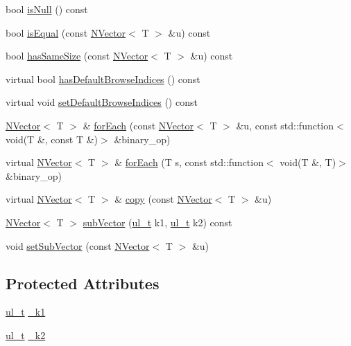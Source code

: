 \begin{DoxyCompactItemize}
\item 
bool \mbox{\hyperlink{class_n_vector_a6d2566f587ad233770ada3aeae0481e1}{is\+Null}} () const
\item 
bool \mbox{\hyperlink{class_n_vector_a496fb038e1612ce56c3b91a9c327c509}{is\+Equal}} (const \mbox{\hyperlink{class_n_vector}{N\+Vector}}$<$ T $>$ \&u) const
\item 
bool \mbox{\hyperlink{class_n_vector_aa9bef4cdf1e57cb0f2e7a3571bdb92a7}{has\+Same\+Size}} (const \mbox{\hyperlink{class_n_vector}{N\+Vector}}$<$ T $>$ \&u) const
\item 
virtual bool \mbox{\hyperlink{class_n_vector_a033460137c1098f8477e6a00e9c2872a}{has\+Default\+Browse\+Indices}} () const
\item 
virtual void \mbox{\hyperlink{class_n_vector_a7f7d365d6ba6e62f627828a528972268}{set\+Default\+Browse\+Indices}} () const
\item 
\mbox{\hyperlink{class_n_vector}{N\+Vector}}$<$ T $>$ \& \mbox{\hyperlink{class_n_vector_a703e598ebcdf39c8f0efa5c619a88d71}{for\+Each}} (const \mbox{\hyperlink{class_n_vector}{N\+Vector}}$<$ T $>$ \&u, const std\+::function$<$ void(T \&, const T \&)$>$ \&binary\+\_\+op)
\item 
virtual \mbox{\hyperlink{class_n_vector}{N\+Vector}}$<$ T $>$ \& \mbox{\hyperlink{class_n_vector_af5cd7c64bfd8eb2335f61d698d6dbf21}{for\+Each}} (T s, const std\+::function$<$ void(T \&, T)$>$ \&binary\+\_\+op)
\item 
virtual \mbox{\hyperlink{class_n_vector}{N\+Vector}}$<$ T $>$ \& \mbox{\hyperlink{class_n_vector_a67128d2ff536b8ccd7a95cb680bd0431}{copy}} (const \mbox{\hyperlink{class_n_vector}{N\+Vector}}$<$ T $>$ \&u)
\item 
\mbox{\hyperlink{class_n_vector}{N\+Vector}}$<$ T $>$ \mbox{\hyperlink{class_n_vector_a8f24d84b8dafde55ba650fd02c188c06}{sub\+Vector}} (\mbox{\hyperlink{typedef_8h_a1b140a2034db3f5dfe18a987745df43a}{ul\+\_\+t}} k1, \mbox{\hyperlink{typedef_8h_a1b140a2034db3f5dfe18a987745df43a}{ul\+\_\+t}} k2) const
\item 
void \mbox{\hyperlink{class_n_vector_a6fd08a3790831a9ada035f720cb0b11f}{set\+Sub\+Vector}} (const \mbox{\hyperlink{class_n_vector}{N\+Vector}}$<$ T $>$ \&u)
\end{DoxyCompactItemize}
\subsection*{Protected Attributes}
\begin{DoxyCompactItemize}
\item 
\mbox{\hyperlink{typedef_8h_a1b140a2034db3f5dfe18a987745df43a}{ul\+\_\+t}} \mbox{\hyperlink{class_n_vector_a355ee9ef9436669e52d0ff4538f85e27}{\+\_\+k1}}
\item 
\mbox{\hyperlink{typedef_8h_a1b140a2034db3f5dfe18a987745df43a}{ul\+\_\+t}} \mbox{\hyperlink{class_n_vector_a6591512e0566996c42f3d74c8174385e}{\+\_\+k2}}
\end{DoxyCompactItemize}
